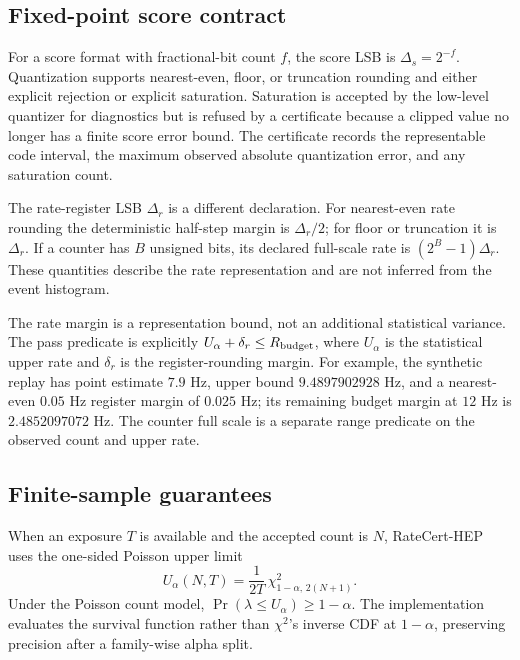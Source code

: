 \documentclass[preprint,12pt]{elsarticle}
\begin{document}
\subsection{Fixed-point score contract}

For a score format with fractional-bit count $f$, the score LSB is
$\Delta_s=2^{-f}$.  Quantization supports nearest-even, floor, or truncation
rounding and either explicit rejection or explicit saturation.  Saturation is
accepted by the low-level quantizer for diagnostics but is refused by a
certificate because a clipped value no longer has a finite score error bound.
The certificate records the representable code interval, the maximum observed
absolute quantization error, and any saturation count.

The rate-register LSB $\Delta_r$ is a different declaration.  For nearest-even
rate rounding the deterministic half-step margin is $\Delta_r/2$; for floor or
truncation it is $\Delta_r$.  If a counter has $B$ unsigned bits, its declared
full-scale rate is $(2^B-1)\Delta_r$.  These quantities describe the rate
representation and are not inferred from the event histogram.

The rate margin is a representation bound, not an additional statistical
variance.  The pass predicate is explicitly
$U_\alpha+\delta_r\le R_{\rm budget}$, where $U_\alpha$ is the statistical
upper rate and $\delta_r$ is the register-rounding margin.  For example, the
synthetic replay has point estimate $7.9$ Hz, upper bound $9.4897902928$ Hz,
and a nearest-even $0.05$ Hz register margin of $0.025$ Hz; its remaining
budget margin at $12$ Hz is $2.4852097072$ Hz.  The counter full scale is a
separate range predicate on the observed count and upper rate.

\subsection{Finite-sample guarantees}

When an exposure $T$ is available and the accepted count is $N$, RateCert-HEP
uses the one-sided Poisson upper limit
\begin{equation}
 U_\alpha(N,T)=\frac{1}{2T}\,\chi^2_{1-\alpha,\,2(N+1)}.
 \label{eq:poisson}
\end{equation}
Under the Poisson count model, $\Pr(\lambda\le U_\alpha)\ge1-\alpha$.
The implementation evaluates the survival function rather than
$\chi^2$'s inverse CDF at $1-\alpha$, preserving precision after a
family-wise alpha split.
\end{document}
